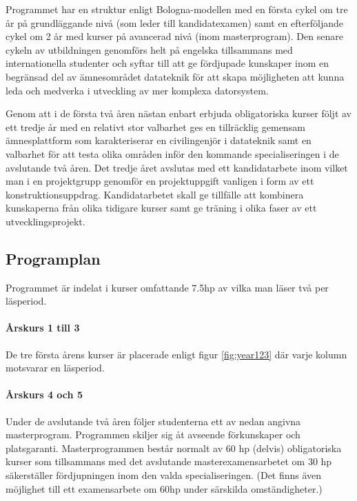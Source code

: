 \documentclass[twocolumn]{article}
\begin{document}
Programmet har en struktur enligt Bologna-modellen med en första cykel
om tre år på grundläggande nivå (som leder till kandidat\-examen) samt
en efterföljande cykel om 2 år med kurser på avancerad nivå (inom
masterprogram). Den senare cykeln av utbildningen genomförs helt på
engelska tillsammans med internationella studenter och syftar till att
ge fördjupade kunskaper inom en begränsad del av ämnesområdet
datateknik för att skapa möjligheten att kunna leda och medverka i
utveckling av mer komplexa datorsystem.

Genom att i de första två åren nästan enbart erbjuda obligatoriska
kurser följt av ett tredje år med en relativt stor valbarhet ges en
tillräcklig gemensam ämnesplattform som karakteriserar en
civilingenjör i datateknik samt en valbarhet för att testa olika
områden inför den kommande specialiseringen i de avslutande två åren.
Det tredje året avslutas med ett kandidatarbete inom vilket man i en
projektgrupp genomför en projektuppgift vanligen i form av ett
konstruktionsuppdrag. Kandidatarbetet skall ge tillfälle att kombinera
kunskaperna från olika tidigare kurser samt ge träning i olika faser
av ett utvecklingsprojekt.

\subsection{Programplan}


Programmet är indelat i kurser omfattande 7.5hp av vilka man läser
två per läsperiod.
\paragraph{Årskurs 1 till 3} De tre första årens kurser är placerade
enligt figur \ref{fig:year123} där varje kolumn motsvarar en läsperiod.

\paragraph{Årskurs 4 och 5}

Under de avslutande två åren följer studenterna ett av nedan angivna
masterprogram.  Programmen skiljer sig åt avseende förkunskaper och
platsgaranti.  Masterprogrammen består normalt av 60 hp (delvis)
obligatoriska kurser som tillsammans med det avslutande
masterexamensarbetet om 30 hp säkerställer fördjupningen inom den
valda specialiseringen. (Det finns även möjlighet till ett
examensarbete om 60hp under särskilda omständigheter.)
\end{document}
